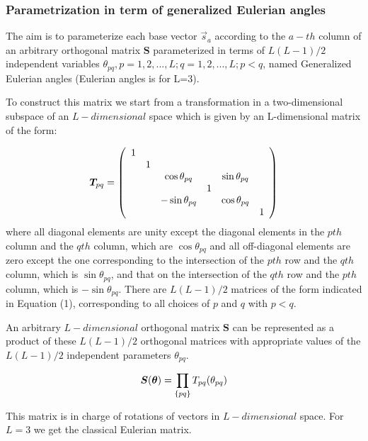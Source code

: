 \documentclass[preprint,amsmath,amssymb,superscriptaddress,showpacs,pre]{revtex4-1}
\let\originalleft\left
\let\originalright\right
\renewcommand{\left}{\mathopen{}\mathclose\bgroup\originalleft}
\renewcommand{\right}{\aftergroup\egroup\originalright}
\begin{document}
\subsubsection{Parametrization in term of generalized Eulerian angles}
The aim is to  parameterize each base vector $\vec{s}_a$ according to the $a-th$ column of an arbitrary orthogonal matrix $\bm S$ parameterized   in terms of $L(L-1)/2$ independent variables  $\theta_ {pq}, p =1,2, ..., L; q =1,2, ..., L; p <q $, named Generalized Eulerian angles (Eulerian angles is for L=3).

To construct this matrix we start from a  transformation in a two-dimensional subspace of an $L-dimensional$ space which is given by an L-dimensional matrix of the  form:

\begin{equation} 
\bm T_{pq} =  \left(
\begin{array}{cccccc}
1 &   &  &  &  &\\
 & 1& & & & \\
& & \cos\theta_{pq} & & \sin\theta_{pq}\\
& &  & 1 & &\\
& &  -\sin\theta_{pq}& & \cos\theta_{pq} &\\
& &  & &  & 1\\
\end{array}
\right)
\end{equation}
where all diagonal elements are unity except the diagonal elements in the $pth$ column and the $qth$ column, which are $\cos\theta_{pq}$ and all off-diagonal elements are zero except the one corresponding to the intersection of the $pth$ row and the $qth$ column, which is $\sin\theta_{pq}$, and that on the intersection of the $qth$ row and the $pth$ column, which is $-\sin\theta_{pq}$. There are $L(L - 1)/2$  matrices of the form indicated in Equation (1), corresponding to all choices of $p$ and $q$ with $p <q$.

An arbitrary  $L-dimensional$ orthogonal matrix $\bm S$ can be represented as a product of these $L(L-1)/2$ orthogonal matrices with appropriate values of the $L(L-1)/2$ independent parameters $\theta_{pq}$.

\begin{equation}
\bm S (\bm \theta)=\prod_{\left\lbrace pq\right\rbrace }T_{pq}(\theta_{pq})
\end{equation}

 This matrix is in charge of rotations of vectors in $L-dimensional$ space. For $L=3$ we get the classical Eulerian matrix. 
\end{document}
